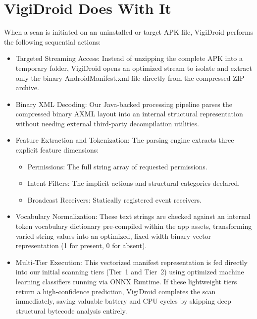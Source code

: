 \section{ VigiDroid Does With It}
When a scan is initiated on an uninstalled or target APK file, VigiDroid performs the following sequential actions:
\begin{itemize}
 

 \item Targeted Streaming Access: Instead of unzipping the complete APK into a temporary folder, VigiDroid opens an optimized stream to isolate and extract only the binary AndroidManifest.xml file directly from the compressed ZIP archive.

 \item Binary XML Decoding: Our Java-backed processing pipeline parses the compressed binary AXML layout into an internal structural representation without needing external third-party decompilation utilities.

 \item Feature Extraction and Tokenization: The parsing engine extracts three explicit feature dimensions:\begin{itemize}


 \item Permissions: The full string array of requested permissions.

 \item Intent Filters: The implicit actions and structural categories declared.

 \item Broadcast Receivers: Statically registered event receivers.
 \end{itemize}

 \item Vocabulary Normalization: These text strings are checked against an internal token vocabulary dictionary pre-compiled within the app assets, transforming varied string values into an optimized, fixed-width binary vector representation (1 for present, 0 for absent).

 \item Multi-Tier Execution: This vectorized manifest representation is fed directly into our initial scanning tiers (Tier~1 and Tier~2) using optimized machine learning classifiers running via ONNX Runtime. If these lightweight tiers return a high-confidence prediction, VigiDroid completes the scan immediately, saving valuable battery and CPU cycles by skipping deep structural bytecode analysis entirely.
 \end{itemize}

